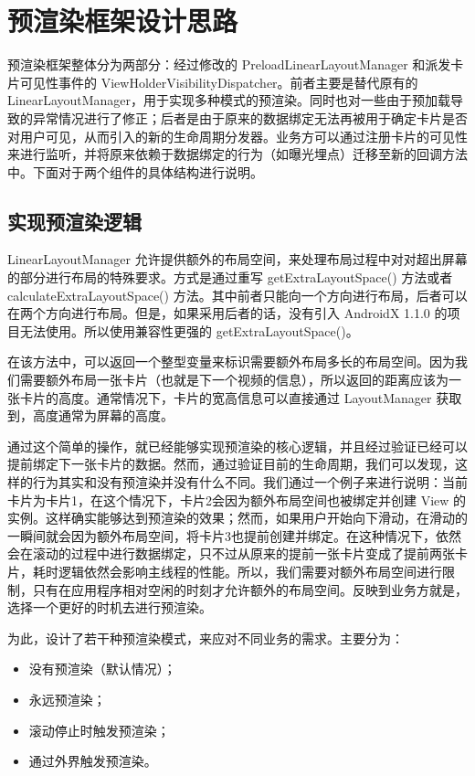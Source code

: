 \chapter{预渲染框架设计思路}

预渲染框架整体分为两部分：经过修改的 PreloadLinearLayoutManager 和派发卡片可见性事件的 ViewHolderVisibilityDispatcher。前者主要是替代原有的 LinearLayoutManager，用于实现多种模式的预渲染。同时也对一些由于预加载导致的异常情况进行了修正；后者是由于原来的数据绑定无法再被用于确定卡片是否对用户可见，从而引入的新的生命周期分发器。业务方可以通过注册卡片的可见性来进行监听，并将原来依赖于数据绑定的行为（如曝光埋点）迁移至新的回调方法中。下面对于两个组件的具体结构进行说明。

\section{实现预渲染逻辑}

LinearLayoutManager 允许提供额外的布局空间，来处理布局过程中对对超出屏幕的部分进行布局的特殊要求。方式是通过重写 getExtraLayoutSpace() 方法或者 calculateExtraLayoutSpace() 方法。其中前者只能向一个方向进行布局，后者可以在两个方向进行布局。但是，如果采用后者的话，没有引入 AndroidX 1.1.0 的项目无法使用。所以使用兼容性更强的 getExtraLayoutSpace()。

在该方法中，可以返回一个整型变量来标识需要额外布局多长的布局空间。因为我们需要额外布局一张卡片（也就是下一个视频的信息），所以返回的距离应该为一张卡片的高度。通常情况下，卡片的宽高信息可以直接通过 LayoutManager 获取到，高度通常为屏幕的高度。

通过这个简单的操作，就已经能够实现预渲染的核心逻辑，并且经过验证已经可以提前绑定下一张卡片的数据。然而，通过验证目前的生命周期，我们可以发现，这样的行为其实和没有预渲染并没有什么不同。我们通过一个例子来进行说明：当前卡片为卡片1，在这个情况下，卡片2会因为额外布局空间也被绑定并创建 View 的实例。这样确实能够达到预渲染的效果；然而，如果用户开始向下滑动，在滑动的一瞬间就会因为额外布局空间，将卡片3也提前创建并绑定。在这种情况下，依然会在滚动的过程中进行数据绑定，只不过从原来的提前一张卡片变成了提前两张卡片，耗时逻辑依然会影响主线程的性能。所以，我们需要对额外布局空间进行限制，只有在应用程序相对空闲的时刻才允许额外的布局空间。反映到业务方就是，选择一个更好的时机去进行预渲染。

为此，设计了若干种预渲染模式，来应对不同业务的需求。主要分为：

\begin{itemize}
    \item 没有预渲染（默认情况）；
    \item 永远预渲染；
    \item 滚动停止时触发预渲染；
    \item 通过外界触发预渲染。
\end{itemize}

